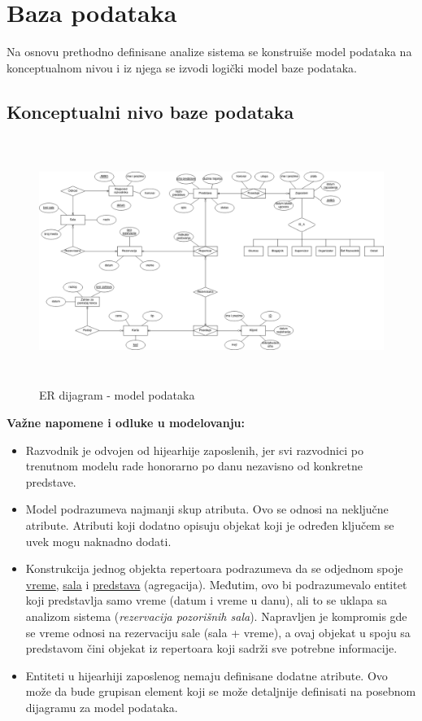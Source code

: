 \documentclass[a4paper]{article}
\begin{document}
\section{Baza podataka}

Na osnovu prethodno definisane analize sistema se konstruiše model podataka na konceptualnom nivou i 
iz njega se izvodi logički model baze podataka. 

\subsection{Konceptualni nivo baze podataka}

\begin{figure}[H]
  \begin{center}
    \includegraphics[width=140mm,height=80mm]{../database-model/model_new.png}
  \end{center}
  \caption{ER dijagram - model podataka}
  \label{er_diagram_model}
\end{figure}

\noindent\textbf{Važne napomene i odluke u modelovanju:}
\begin{itemize}
  \item Razvodnik je odvojen od hijearhije zaposlenih, jer svi razvodnici po trenutnom
        modelu rade honorarno po danu nezavisno od konkretne predstave.
  \item Model podrazumeva najmanji skup atributa. Ovo se odnosi na neključne atribute. Atributi
        koji dodatno opisuju objekat koji je određen ključem se uvek mogu naknadno dodati.
  \item Konstrukcija jednog objekta repertoara podrazumeva da se odjednom spoje \underline{vreme},
        \underline{sala} i \underline{predstava} (agregacija). Međutim, ovo bi podrazumevalo
        entitet koji predstavlja samo vreme (datum i vreme u danu), ali to se uklapa sa analizom
        sistema (\textit{rezervacija pozorišnih sala}). Napravljen je kompromis gde se vreme
        odnosi na rezervaciju sale (sala + vreme), a ovaj objekat u spoju sa predstavom 
        čini objekat iz repertoara koji sadrži sve potrebne informacije. 
  \item Entiteti u hijearhiji zaposlenog nemaju definisane dodatne atribute. Ovo može da bude grupisan
        element koji se može detaljnije definisati na posebnom dijagramu za model podataka.
\end{itemize}
\end{document}
